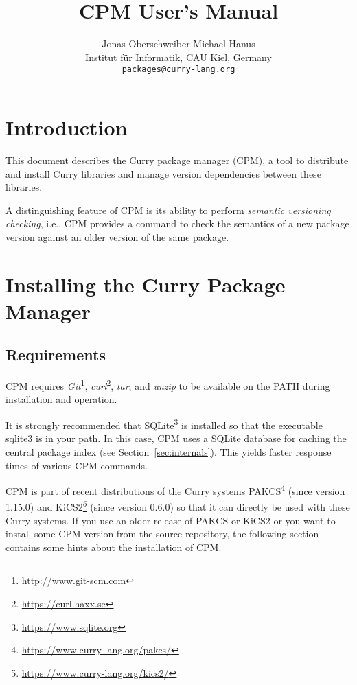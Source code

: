 \documentclass[11pt]{article}
\renewcommand{\tt}{\usefont{OT1}{cmtt}{m}{n}\selectfont}
\newcommand{\codefont}{\small\tt}
\newcommand{\code}[1]{\mbox{\codefont #1}}
\begin{document}
\title{CPM User's Manual}

\author{Jonas Oberschweiber \qquad Michael Hanus\\[1ex]
{\small Institut f\"ur Informatik, CAU Kiel, Germany}\\[1ex]
{\small\texttt{packages@curry-lang.org}}
}

\maketitle

\tableofcontents

\clearpage


\section{Introduction}

This document describes the Curry package manager (CPM), a tool to
distribute and install Curry libraries and manage version dependencies
between these libraries.

A distinguishing feature of CPM is its ability to perform
\emph{semantic versioning checking}, i.e., CPM provides a command
to check the semantics of a new package version against an
older version of the same package.


\bigskip\bigskip

\section{Installing the Curry Package Manager}

\subsection{Requirements}

CPM requires
\emph{Git}\footnote{\url{http://www.git-scm.com}},
\emph{curl}\footnote{\url{https://curl.haxx.se}},
\emph{tar},
and \emph{unzip} to be available on the \code{PATH} during installation and 
operation.

It is strongly recommended that
SQLite\footnote{\url{https://www.sqlite.org}} is installed
so that the executable \code{sqlite3} is in your path.
In this case, CPM uses a SQLite database for caching
the central package index (see Section~\ref{sec:internals}).
This yields faster response times of various CPM commands.

CPM is part of recent distributions of the Curry systems
PAKCS\footnote{\url{https://www.curry-lang.org/pakcs/}}
(since version 1.15.0)
and
KiCS2\footnote{\url{https://www.curry-lang.org/kics2/}}
(since version 0.6.0) so that it can directly be used with
these Curry systems.
If you use an older release of PAKCS or KiCS2 or you want to
install some CPM version from the source repository,
the following section contains some hints about the installation of CPM.
\end{document}

